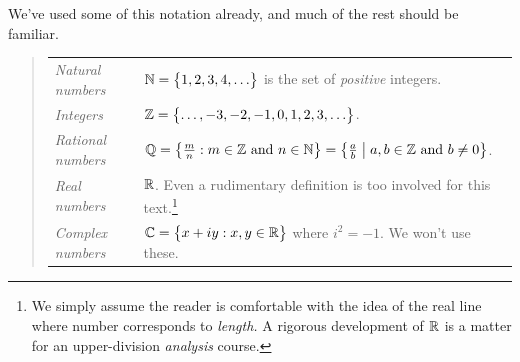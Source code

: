 
We've used some of this notation already, and much of the rest should be familiar.%
\vspace{-2pt}

\begin{quote}\def\arraystretch{1.15}
\begin{tabular}{@{}ll}
	\emph{Natural numbers}&$\mathbb{N}=\bigl\{1,2,3,4,\ldots\bigr\}$ is the set of \emph{positive} integers.\\
	\emph{Integers}&$\mathbb{Z}=\bigl\{\ldots,-3,-2,-1,0,1,2,3,\ldots\bigr\}$.\\
	\emph{Rational numbers}&$\mathbb{Q}=\bigl\{\frac mn:m\in\mathbb{Z}\text{ and }n\in\mathbb{N}\bigr\} =\bigl\{\frac ab\bigm| a,b\in\mathbb{Z}\text{ and }b\neq 0\bigr\}$.\\
	\emph{Real numbers}&$\mathbb{R}$. Even a rudimentary definition is too involved for this text.\footnote{We simply assume the reader is comfortable with the idea of the real line where number corresponds to \emph{length.} A rigorous development of $\mathbb{R}$ is a matter for an upper-division \emph{analysis} course.}\\
	\emph{Complex numbers}&$\mathbb{C}=\bigl\{x+iy:x,y\in\mathbb{R}\bigr\}$ where $i^2=-1$. We won't use these.
\end{tabular}
\end{quote}


